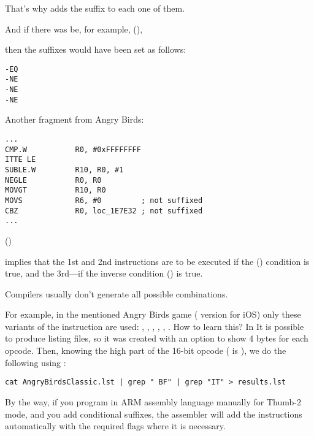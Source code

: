 That's why \IDA adds the  suffix to each one of them. 

And if there was be, for example,  (), 

then the suffixes would have been set as follows:

\begin{lstlisting}
-EQ
-NE
-NE
-NE
\end{lstlisting}

Another fragment from Angry Birds:

\begin{lstlisting}[caption=Angry Birds Classic]
...
CMP.W           R0, #0xFFFFFFFF
ITTE LE
SUBLE.W         R10, R0, #1
NEGLE           R0, R0
MOVGT           R10, R0
MOVS            R6, #0         ; not suffixed
CBZ             R0, loc_1E7E32 ; not suffixed
...
\end{lstlisting}

 () 

implies that the 1st and 2nd instructions are to be executed if the  ()
condition is true, and the 3rd---if the inverse condition (\EMDASH{}) 
is true.

Compilers usually don't generate all possible combinations.

For example, in the mentioned Angry Birds game ( version for iOS)
only these variants of the  instruction are used: 
, , , , , .
\myindex{\GrepUsage}
How to learn this?
In \IDA It is possible to produce listing files, so it was created with an option to show 4 bytes for each opcode.
Then, knowing the high part of the 16-bit opcode ( is ), we do the following using :

\begin{lstlisting}
cat AngryBirdsClassic.lst | grep " BF" | grep "IT" > results.lst
\end{lstlisting}


By the way, if you program in ARM assembly language manually for Thumb-2 mode, 
and you add conditional suffixes,
the assembler will add the  instructions automatically with the required flags where it is necessary.

\subsubsectionold{\NonOptimizingXcodeIV (\ARMMode)}

